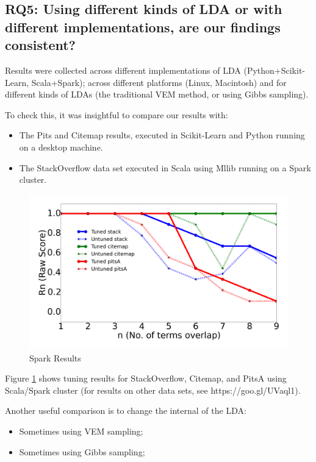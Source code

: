 \documentclass[twocolumn,5p,sort&compress]{elsarticle}
\newcommand{\bi}{\begin{itemize}}
\newcommand{\ei}{\end{itemize}}
\theoremstyle{break}
\begin{document}
\subsection{\textbf{RQ5}: \textbf{Using different kinds of LDA or with different implementations, are our findings consistent?}}

Results were collected across different implementations of LDA (Python+Scikit-Learn, Scala+Spark); across different platforms (Linux, Macintosh) and for different kinds of LDAs (the traditional VEM method, or using Gibbs sampling). 

To check this, it was insightful to compare our results with:
\bi
\item The Pits and Citemap results, executed in Scikit-Learn and Python running on
  a desktop machine.
\item The StackOverflow data set executed in Scala using Mllib running on a Spark cluster.
  \ei

\begin{figure}[!htbp]
  \captionsetup{justification=centering}
  \includegraphics[width=\linewidth]{./fig/spark.png}
  \caption{Spark Results}
  \label{python_spark}
\end{figure}

Figure \ref{python_spark} shows tuning results for StackOverflow, Citemap, and PitsA 
   using Scala/Spark cluster (for results on other data sets, see https://goo.gl/UVaql1).
   
  Another useful comparison is to change the internal of the LDA:
  \bi
\item Sometimes using VEM sampling;
\item Sometimes using Gibbs sampling;
  \ei
\end{document}
